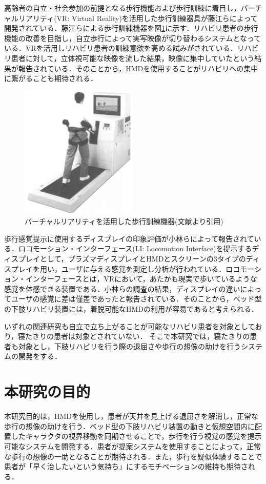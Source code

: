 高齢者の自立・社会参加の前提となる歩行機能および歩行訓練に着目し，バーチャルリアリティ(VR: Virtual Reality)を活用した歩行訓練器具\cite{日立}が藤江らによって開発されている．藤江らによる歩行訓練機器を図\ref{fig:hitachi}に示す．リハビリ患者の歩行機能の改善を目指し，自立歩行によって実写映像が切り替わるシステムとなっている．VRを活用しリハビリ患者の訓練意欲を高める試みがされている．リハビリ患者に対して，立体視可能な映像を流した結果，映像に集中していたという結果が報告されている．そのことから，HMDを使用することがリハビリへの集中に繋がることも期待される．
\begin{figure}[tbp]
	\centering
			\includegraphics[width=0.5\textwidth]{chap1-figure/VRhokou.eps}
	\caption{バーチャルリアリティを活用した歩行訓練機器(文献\cite{日立}より引用)}
	\label{fig:hitachi}
\end{figure}

歩行感覚提示に使用するディスプレイの印象評価\cite{ディスプレイの違い}が小林らによって報告されている．ロコモーション・インターフェース\cite{ロコモーション}(LI: Locomotion Interface)を提示するディスプレイとして，プラズマディスプレイとHMDとスクリーンの3タイプのディスプレイを用い，ユーザに与える感覚を測定し分析が行われている．ロコモーション・インターフェースとは，VRにおいて，あたかも現実で歩いているような感覚を体感できる装置である．小林らの調査の結果，ディスプレイの違いによってユーザの感覚に差は僅差であったと報告されている．そのことから，ベッド型の下肢リハビリ装置には，着脱可能なHMDの利用が容易であると考えられる．

いずれの関連研究も自立で立ち上がることが可能なリハビリ患者を対象としており，寝たきりの患者は対象とされていない．
そこで本研究では，寝たきりの患者も対象とし，下肢リハビリを行う際の退屈さや歩行の想像の助けを行うシステムの開発をする．

\section{本研究の目的}
本研究目的は，HMDを使用し，患者が天井を見上げる退屈さを解消し，正常な歩行の想像の助けを行う．ベッド型の下肢リハビリ装置の動きと仮想空間内に配置したキャラクタの視界移動を同期させることで，歩行を行う視覚の感覚を提示可能なシステムを開発する．患者が提案システムを使用することによって，正常な歩行の想像の一助となることが期待される．また，歩行を疑似体験することで患者が「早く治したいという気持ち」にするモチベーションの維持も期待される．
